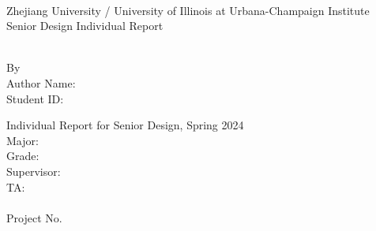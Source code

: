 \documentclass[../individual_thesis.tex]{subfiles}
\begin{document}
\begin{titlepage}
    \begin{center}
        ~~\\ %
        \vspace{1.5cm}
        {\fontsize{16}{24}\selectfont Zhejiang University / University of Illinois at Urbana-Champaign Institute}\\
        \vspace{1.88cm}
        {\fontsize{28}{42}\selectfont Senior Design Individual Report}\\
        \vspace{1.6cm}
        \begin{minipage}{15.92cm}
            \centering
            \fontsize{26}{26}\selectfont
            \MakeUppercase{\bf \RPTTITLE}
        \end{minipage}\\[2cm]
        {\fontsize{14}{21}\selectfont By}\\[1.5em]
        {\fontsize{14}{21}\selectfont Author Name: \AUTHORNAME}\\
        {\fontsize{14}{21}\selectfont Student ID: \STUDENTID}

        \vfill
        {\fontsize{12}{\baselineskip}\selectfont Individual Report for Senior Design, Spring 2024\\
            Major: \MAJOR \\
            Grade: \GRADE \\
            Supervisor: \FACULTYNAME \\
            TA:~ \TANAME\\
            \vfill}
        {\fontsize{12}{18}\selectfont\RPTDATE\\
            Project No. \PROJECTNUMBER}
    \end{center}
    \vspace{2cm}
    ~
    \restoregeometry
\end{titlepage}
\thispagestyle{empty}
\end{document}

